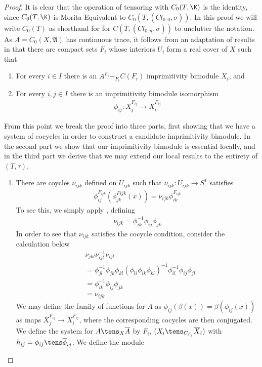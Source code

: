 \begin{proof}
	It is clear that the operation of tensoring with $C_0(T,\K)$ is the identity, since $C_0(T,\K)$ is Morita Equivalent to $C_0(T,(Cl_{0,0},\sigma))$. In this proof we will write $C_0(T)$ as shorthand for for $C(T,(Cl_{0,n},\sigma))$ to unclutter the notation. 
	As $A=C_0(X,\mathfrak{A})$ has continuous trace, it follows from an adaptation of results in \cite[Chapter 5]{raeburncont} that there are compact sets $F_i$ whose interiors $U_i$ form a real cover of $X$ such that 
	\begin{enumerate}
		\item For every $i \in I$ there is an $A^{F_i}-_{F_i}C(F_i)$ imprimitivity bimodule $X_i$, and 
		\item
		For every $i,j\in I$ there is an imprimitivity bimodule isomorphism \begin{align*} \phi_{ij}:X_j^{F_{ij}}\to X_i^{F_{ij}} \end{align*}
	\end{enumerate}
	From this point we break the proof into three parts, first showing that we have a system of cocycles in order to construct a candidate imprimitivity bimodule. In the second part we show that our imprimitivity bimodule is essential locally, and in the third part we derive that we may extend our local results to the entirety of $(T,\tau)$.
	\begin{enumerate}
\item
	There are coycles $\nu_{ijk}$ defined on $U_{ijk}$ such that $\nu_{ijk}: U_{ijk} \to S^1$ satisfies 
		\begin{align*}
			\phi_{ij}^{F_{ijk}}(\phi_{jk}^{Fijk}(x))=\nu_{ijk}\phi_{ik}^{F_{ijk}}
		\end{align*}
	To see this, we simply apply , defining 
	\begin{align*}
		\nu_{ijk}=\phi_{ik}^{-1}\phi_{ij}\phi_{jk}
	\end{align*}
	In order to see that $\nu_{ijk}$ satisfies the cocycle condition, consider the calculation below
	\begin{align*}
		&\nu_{jkl}\nu_{ijl}^{-1}\nu_{ijl} \\
		&=\phi_{jl}^{-1}\phi_{jk}\phi_{kl}(\phi_{li}\phi_{ik}\phi_{kl})^{-1}\phi_{il}^{-1}\phi_{ij}\phi_{jl} \\
		&=\phi_{ik}^{-1}\phi_{ij}\phi_{jk} \\
		&=\nu_{ijk}
	\end{align*}
	We may define the family of functions for $\overline{A}$ as $\phi_{ij}(\beta(x))=\beta(\phi_{ij}(x))$ as maps $\overline{X}_j^{F_{ij}}\to \overline{X}_i^{F_{ij}}$, where the corresponding cocycles are then conjugated. We define the system for $A\tens_{X} \overline{A}$ by $F_i$, $(X_i\tens_{ C_{F_i}} \overline{X}_i)$ with $h_{ij}=\phi_{ij}\tens \overline{\phi}_{ij}$. We define the module 

\end{enumerate}
\end{proof}
